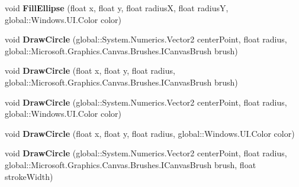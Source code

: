 \begin{DoxyCompactItemize}
\item 
\mbox{\label{class_microsoft_1_1_graphics_1_1_canvas_1_1_canvas_drawing_session_a798f467f35e7944331a03a89ce48d954}} 
void {\bfseries Fill\+Ellipse} (float x, float y, float radiusX, float radiusY, global\+::\+Windows.\+U\+I.\+Color color)
\item 
\mbox{\label{class_microsoft_1_1_graphics_1_1_canvas_1_1_canvas_drawing_session_a2175af501fac35ca7d03ddf40c04546e}} 
void {\bfseries Draw\+Circle} (global\+::\+System.\+Numerics.\+Vector2 center\+Point, float radius, global\+::\+Microsoft.\+Graphics.\+Canvas.\+Brushes.\+I\+Canvas\+Brush brush)
\item 
\mbox{\label{class_microsoft_1_1_graphics_1_1_canvas_1_1_canvas_drawing_session_aef85641b12aef9c2b746df1fa8af9340}} 
void {\bfseries Draw\+Circle} (float x, float y, float radius, global\+::\+Microsoft.\+Graphics.\+Canvas.\+Brushes.\+I\+Canvas\+Brush brush)
\item 
\mbox{\label{class_microsoft_1_1_graphics_1_1_canvas_1_1_canvas_drawing_session_a996ecefdbf4c783953dc55fd8689ccca}} 
void {\bfseries Draw\+Circle} (global\+::\+System.\+Numerics.\+Vector2 center\+Point, float radius, global\+::\+Windows.\+U\+I.\+Color color)
\item 
\mbox{\label{class_microsoft_1_1_graphics_1_1_canvas_1_1_canvas_drawing_session_a4ee8397d940e90ed47b1c1bc93f08e6c}} 
void {\bfseries Draw\+Circle} (float x, float y, float radius, global\+::\+Windows.\+U\+I.\+Color color)
\item 
\mbox{\label{class_microsoft_1_1_graphics_1_1_canvas_1_1_canvas_drawing_session_aaeaab312190aa6abaa39544f0d505d26}} 
void {\bfseries Draw\+Circle} (global\+::\+System.\+Numerics.\+Vector2 center\+Point, float radius, global\+::\+Microsoft.\+Graphics.\+Canvas.\+Brushes.\+I\+Canvas\+Brush brush, float stroke\+Width)
\item 

\end{DoxyCompactItemize}
